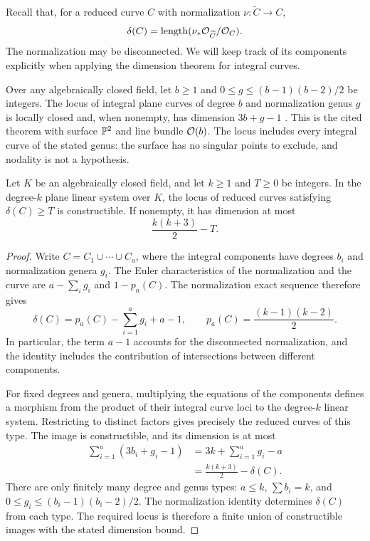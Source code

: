 Recall that, for a reduced curve $C$ with normalization
$\nu:\widetilde C\to C$,
\[
 \delta(C)=\operatorname{length}(\nu_*\mathcal O_{\widetilde C}/\mathcal O_C).
\]
The normalization may be disconnected.  We will keep track of its
components explicitly when applying the dimension theorem for integral
curves.

Over any algebraically closed field, let $b\geq1$ and
$0\leq g\leq(b-1)(b-2)/2$ be integers.  The locus of integral plane
curves of degree $b$ and normalization genus $g$ is locally closed and,
when nonempty, has dimension $3b+g-1$
\cite[Lemma~2.6, Proposition~2.7, and Remark~2.8]{CHT2023}.
This is the cited theorem with surface $\mathbb P^2$ and line bundle $\mathcal O(b)$.
The locus includes every integral curve of the stated genus: the surface
has no singular points to exclude, and nodality is not a hypothesis.

\begin{lemma}
Let $K$ be an algebraically closed field\label{lem:severi-dimension}, and let $k\geq1$ and $T\geq0$
be integers.  In the degree-$k$ plane linear system over $K$, the locus
of reduced curves satisfying $\delta(C)\geq T$ is constructible.
If nonempty, it has dimension at most
\[
 \frac{k(k+3)}2-T.
\]
\end{lemma}

\begin{proof}
Write $C=C_1\cup\cdots\cup C_a$, where the integral components have
degrees $b_i$ and normalization genera $g_i$.  The Euler characteristics
of the normalization and the curve are $a-\sum_i g_i$ and $1-p_a(C)$.
The normalization exact sequence therefore gives
\[
 \delta(C)=p_a(C)-\sum_{i=1}^a g_i+a-1,
 \qquad p_a(C)=\frac{(k-1)(k-2)}2.
\]
In particular, the term $a-1$ accounts for the disconnected normalization,
and the identity includes the contribution of intersections between
different components.

For fixed degrees and genera, multiplying the equations of the
components defines a morphism from the product of their integral curve
loci to the degree-$k$ linear system.  Restricting to distinct factors
gives precisely the reduced curves of this type.  The image is
constructible, and its dimension is at most
\begin{align*}
 \sum_{i=1}^a(3b_i+g_i-1)
 &=3k+\sum_{i=1}^a g_i-a\\
 &=\frac{k(k+3)}2-\delta(C).
\end{align*}
There are only finitely many degree and genus types:
$a\leq k$, $\sum b_i=k$, and
$0\leq g_i\leq(b_i-1)(b_i-2)/2$.
The normalization identity determines $\delta(C)$ from each type.
The required locus is therefore a finite union of constructible images
with the stated dimension bound.
\end{proof}


